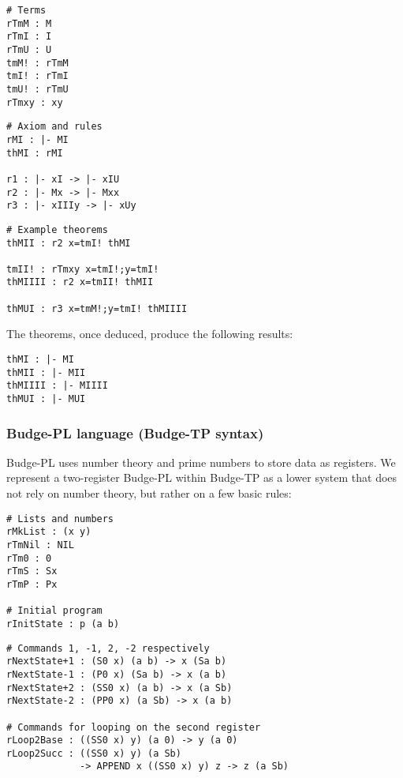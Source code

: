 \documentclass{article}
\begin{document}
\begin{minipage}{0.30\textwidth}
\begin{verbatim}
# Terms
rTmM : M
rTmI : I
rTmU : U
tmM! : rTmM
tmI! : rTmI
tmU! : rTmU
rTmxy : xy
\end{verbatim}
\end{minipage}
\begin{minipage}{0.33\textwidth}
\begin{verbatim}
# Axiom and rules
rMI : |- MI
thMI : rMI

r1 : |- xI -> |- xIU
r2 : |- Mx -> |- Mxx
r3 : |- xIIIy -> |- xUy
\end{verbatim}
\end{minipage}
\begin{minipage}{0.33\textwidth}
\begin{verbatim}
# Example theorems
thMII : r2 x=tmI! thMI

tmII! : rTmxy x=tmI!;y=tmI!
thMIIII : r2 x=tmII! thMII

thMUI : r3 x=tmM!;y=tmI! thMIIII
\end{verbatim}
\end{minipage}

The theorems, once deduced, produce the following results:

\begin{verbatim}
thMI : |- MI
thMII : |- MII
thMIIII : |- MIIII
thMUI : |- MUI
\end{verbatim}

\subsubsection{Budge-PL language (Budge-TP syntax)}

Budge-PL uses number theory and prime numbers to store data as registers. We represent a two-register Budge-PL within Budge-TP as a lower system that does not rely on number theory, but rather on a few basic rules:

\begin{minipage}{0.40\textwidth}
\begin{verbatim}
# Lists and numbers
rMkList : (x y)
rTmNil : NIL
rTm0 : 0
rTmS : Sx
rTmP : Px

# Initial program
rInitState : p (a b)
\end{verbatim}
\end{minipage}
\begin{minipage}{0.58\textwidth}
\begin{verbatim}
# Commands 1, -1, 2, -2 respectively
rNextState+1 : (S0 x) (a b) -> x (Sa b)
rNextState-1 : (P0 x) (Sa b) -> x (a b)
rNextState+2 : (SS0 x) (a b) -> x (a Sb)
rNextState-2 : (PP0 x) (a Sb) -> x (a b)

# Commands for looping on the second register
rLoop2Base : ((SS0 x) y) (a 0) -> y (a 0)
rLoop2Succ : ((SS0 x) y) (a Sb)
             -> APPEND x ((SS0 x) y) z -> z (a Sb)
\end{verbatim}
\end{minipage}
\end{document}

